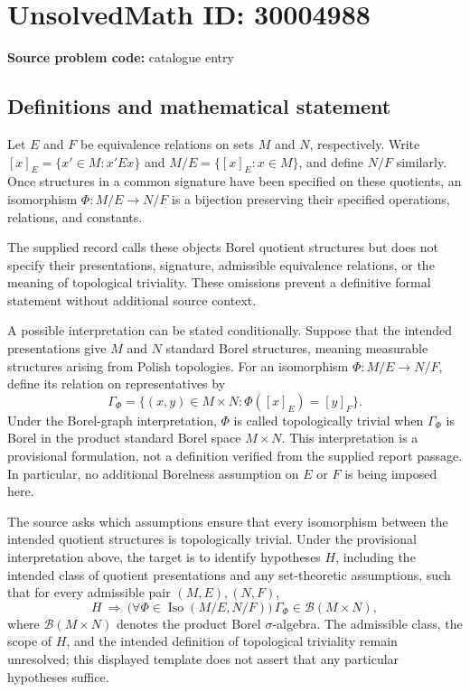 \documentclass[11pt]{article}
\begin{document}
\section*{UnsolvedMath ID: 30004988}
\textbf{Source problem code:} catalogue entry
\subsection{Definitions and mathematical statement}
Let \(E\) and \(F\) be equivalence relations on sets \(M\) and \(N\), respectively. Write \([x]_E=\{x'\in M:x'Ex\}\) and \(M/E=\{[x]_E:x\in M\}\), and define \(N/F\) similarly. Once structures in a common signature have been specified on these quotients, an isomorphism \(\Phi:M/E\to N/F\) is a bijection preserving their specified operations, relations, and constants.

The supplied record calls these objects Borel quotient structures but does not specify their presentations, signature, admissible equivalence relations, or the meaning of topological triviality. These omissions prevent a definitive formal statement without additional source context.

A possible interpretation can be stated conditionally. Suppose that the intended presentations give \(M\) and \(N\) standard Borel structures, meaning measurable structures arising from Polish topologies. For an isomorphism \(\Phi:M/E\to N/F\), define its relation on representatives by
\[
\Gamma_{\Phi}=\{(x,y)\in M\times N:\Phi([x]_E)=[y]_F\}.
\]
Under the Borel-graph interpretation, \(\Phi\) is called topologically trivial when \(\Gamma_{\Phi}\) is Borel in the product standard Borel space \(M\times N\). This interpretation is a provisional formulation, not a definition verified from the supplied report passage. In particular, no additional Borelness assumption on \(E\) or \(F\) is being imposed here.

The source asks which assumptions ensure that every isomorphism between the intended quotient structures is topologically trivial. Under the provisional interpretation above, the target is to identify hypotheses \(H\), including the intended class of quotient presentations and any set-theoretic assumptions, such that for every admissible pair \((M,E),(N,F)\),
\[
H\ \Longrightarrow\ 
\bigl(\forall\Phi\in\operatorname{Iso}(M/E,N/F)\bigr)\,
\Gamma_{\Phi}\in\mathcal B(M\times N),
\]
where \(\mathcal B(M\times N)\) denotes the product Borel \(\sigma\)-algebra. The admissible class, the scope of \(H\), and the intended definition of topological triviality remain unresolved; this displayed template does not assert that any particular hypotheses suffice.
\end{document}
